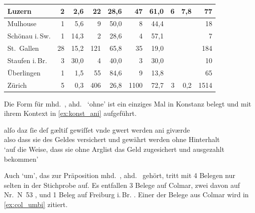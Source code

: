 \begin{table}
\begin{tabular}{
	l @{\qquad}
	r r @{\qquad}
	r r @{\qquad}
	r r @{\qquad}
	r r @{\qquad}
	r}
\midrule

Luzern
	& 2		& 2,6
	& 22	& 28,6
	& 47	& 61,0
	& 6		& 7,8
	& 77
	\\

\midrule

Mulhouse
	& 1	& 5,6
	& 9	& 50,0
	& 8	& 44,4
	&	&
	& 18
	\\

\midrule

Schönau i.\,Sw.
	& 1	& 14,3
	& 2	& 28,6
	& 4	& 57,1
	&	&
	& 7
	\\

\midrule

St.~Gallen
	& 28	& 15,2
	& 121	& 65,8
	& 35	& 19,0
	&		&
	& 184
	\\

\midrule

Staufen i.\,Br.
	& 3 & 30,0
	& 4	& 40,0
	& 3	& 30,0
	&	&
	& 10
	\\

\midrule

Überlingen
	& 1		& 1,5	
	& 55	& 84,6
	& 9		& 13,8
	&		&
	& 65
	\\

\midrule

Zürich
	& 5		& 0,3
	& 406	& 26,8
	& 1100	& 72,7
	& 3		& 0,2
	& 1514
	\\



\bottomrule
\end{tabular}
\label{tab:ispelx}
\end{table}

Die Form  für mhd.~, ahd.~ `ohne' ist ein einziges
Mal in Konstanz belegt und mit ihrem Kontext in \cref{ex:konst_ani} aufgeführt.

\begin{exe}
\ex\label{ex:konst_ani}
	\gll alſo daz ſie deſ gæltiſ gewiſſet vnde gwert werden ani giværde \\
		also dass sie des Geldes versichert und gewährt werden ohne
			Hinterhalt \\
	\trans `auf die Weise, dass sie ohne Arglist das Geld zugesichert und
		ausgezahlt bekommen'
		\parencites(Nr.~17, Konstanz, 1251)[26,22]{cao1}
\end{exe}

Auch  `um', das zur Präposition mhd.~, ahd.~
gehört, tritt mit 4 Belegen nur selten in der Stichprobe auf. Es entfallen 3
Belege auf Colmar, zwei davon auf Nr.~N~53 \autocites(Colmar,
1264)[37,2--17]{cao5}, und 1 Beleg auf Freiburg i.\,Br. \autocites(Nr.~2580,
Freiburg i.\,Br., 1297)[9,21--33]{cao4}. Einer der Belege aus Colmar wird in
\cref{ex:col_umbi} zitiert.


